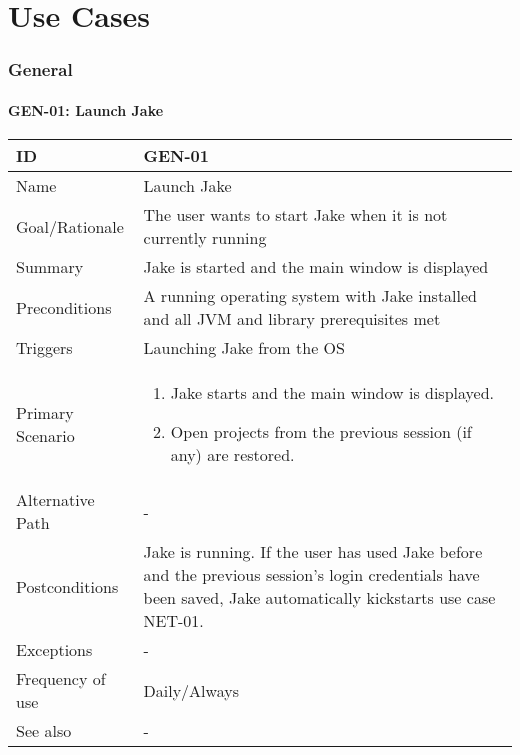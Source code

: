 \part{Use Cases}
\section{General}

\def\ucreset{
\def\ucid{-}
\def\ucname{-}
\def\ucrationale{-}
\def\ucsummary{-}
\def\ucpreconditions{-}
\def\uctriggers{-}
\def\ucprimaryscenario{-}
\def\ucalternativepath{-}
\def\ucexceptions{-}
\def\ucpostconditions{-}
\def\ucfrequency{-}
\def\ucsee{-}
}

\def\ucprint{
\subsection{\ucid: \ucname}
\begin{tabular}{|p{3.3cm}|p{12cm}|}
\hline
ID & \ucid \\ 
\hline 
Name & \ucname \\
\hline
Goal/Rationale & \ucrationale \\ 
\hline 
Summary & \ucsummary \\ 
\hline
Preconditions & \ucpreconditions \\
\hline
Triggers & \uctriggers \\
\hline
Primary Scenario & \ucprimaryscenario \\
\hline
Alternative Path & \ucalternativepath \\
\hline
Postconditions & \ucpostconditions  \\
\hline
Exceptions & \ucexceptions \\
\hline
Frequency of use & \ucfrequency  \\
\hline
See also & \ucsee \\
\hline
\end{tabular}
}


\ucreset
\def\ucid{GEN-01}
\def\ucname{Launch Jake}
\def\ucrationale{The user wants to start Jake when it is not currently running}
\def\ucsummary{Jake is started and the main window is displayed}
\def\ucpreconditions{A running operating system with Jake installed and all JVM and library prerequisites met}
\def\uctriggers{Launching Jake from the OS}
\def\ucprimaryscenario{
\begin{enumerate}
\item Jake starts and the main window is displayed.
\item Open projects from the previous session (if any) are restored.
\end{enumerate}}
\def\ucpostconditions{Jake is running. If the user has used Jake before and the previous session's login credentials have been saved, Jake automatically kickstarts use case NET-01.}
\def\ucfrequency{Daily/Always}
\ucprint

